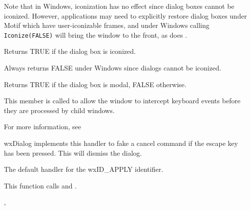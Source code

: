 
Note that in Windows, iconization has no effect since dialog boxes cannot be
iconized. However, applications may need to explicitly restore dialog
boxes under Motif which have user-iconizable frames, and under Windows
calling {\tt Iconize(FALSE)} will bring the window to the front, as does
.

\label{wxdialogisiconized}


Returns TRUE if the dialog box is iconized.


Always returns FALSE under Windows since dialogs cannot be iconized.

\label{wxdialogismodal}


Returns TRUE if the dialog box is modal, FALSE otherwise.

\label{wxdialogoncharhook}


This member is called to allow the window to intercept keyboard events
before they are processed by child windows.

For more information, see 


wxDialog implements this handler to fake a cancel command if the escape key has been
pressed. This will dismiss the dialog.

\label{wxdialogonapply}


The default handler for the wxID\_APPLY identifier.


This function calls  and .


, 

\label{wxdialogoncancel}

